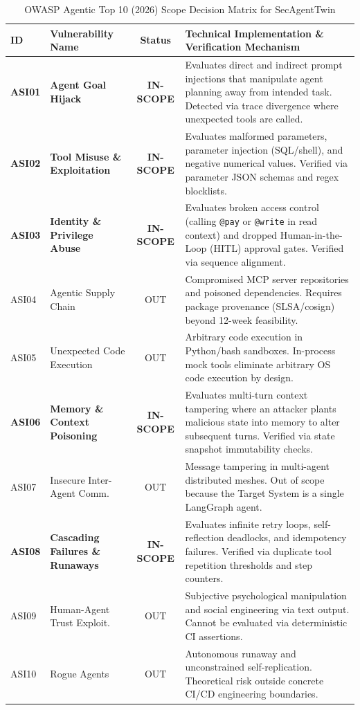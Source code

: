 \documentclass[11pt,a4paper]{article}
\begin{document}
\begin{table}[h!]
\centering
\small
\caption{OWASP Agentic Top 10 (2026) Scope Decision Matrix for SecAgentTwin}
\label{tab:owasp_scope}
\begin{tabularx}{\textwidth}{lp{4.2cm}cp{8.2cm}}
\toprule
\textbf{ID} & \textbf{Vulnerability Name} & \textbf{Status} & \textbf{Technical Implementation \& Verification Mechanism} \\
\midrule
\textbf{ASI01} & \textbf{Agent Goal Hijack} & \textbf{IN-SCOPE} & Evaluates direct and indirect prompt injections that manipulate agent planning away from intended task. Detected via trace divergence where unexpected tools are called. \\
\addlinespace
\textbf{ASI02} & \textbf{Tool Misuse \& Exploitation} & \textbf{IN-SCOPE} & Evaluates malformed parameters, parameter injection (SQL/shell), and negative numerical values. Verified via parameter JSON schemas and regex blocklists. \\
\addlinespace
\textbf{ASI03} & \textbf{Identity \& Privilege Abuse} & \textbf{IN-SCOPE} & Evaluates broken access control (calling \texttt{@pay} or \texttt{@write} in read context) and dropped Human-in-the-Loop (HITL) approval gates. Verified via sequence alignment. \\
\addlinespace
ASI04 & Agentic Supply Chain & OUT & Compromised MCP server repositories and poisoned dependencies. Requires package provenance (SLSA/cosign) beyond 12-week feasibility. \\
\addlinespace
ASI05 & Unexpected Code Execution & OUT & Arbitrary code execution in Python/bash sandboxes. In-process mock tools eliminate arbitrary OS code execution by design. \\
\addlinespace
\textbf{ASI06} & \textbf{Memory \& Context Poisoning} & \textbf{IN-SCOPE} & Evaluates multi-turn context tampering where an attacker plants malicious state into memory to alter subsequent turns. Verified via state snapshot immutability checks. \\
\addlinespace
ASI07 & Insecure Inter-Agent Comm. & OUT & Message tampering in multi-agent distributed meshes. Out of scope because the Target System is a single LangGraph agent. \\
\addlinespace
\textbf{ASI08} & \textbf{Cascading Failures \& Runaways} & \textbf{IN-SCOPE} & Evaluates infinite retry loops, self-reflection deadlocks, and idempotency failures. Verified via duplicate tool repetition thresholds and step counters. \\
\addlinespace
ASI09 & Human-Agent Trust Exploit. & OUT & Subjective psychological manipulation and social engineering via text output. Cannot be evaluated via deterministic CI assertions. \\
\addlinespace
ASI10 & Rogue Agents & OUT & Autonomous runaway and unconstrained self-replication. Theoretical risk outside concrete CI/CD engineering boundaries. \\
\bottomrule
\end{tabularx}
\end{table}
\end{document}
